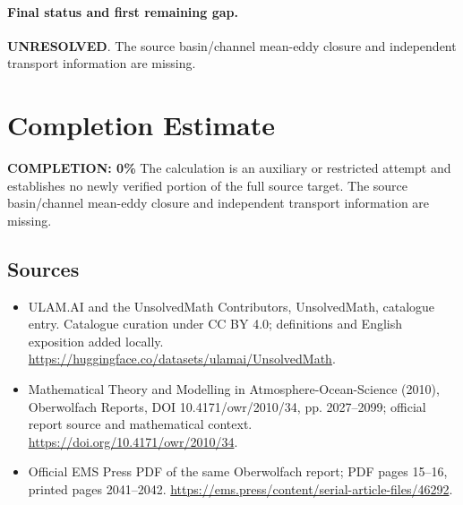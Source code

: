 \documentclass[11pt]{article}
\begin{document}
\paragraph{Final status and first remaining gap.}
\textbf{UNRESOLVED}. The source basin/channel mean-eddy closure and independent transport information are missing.

\section{Completion Estimate}
\noindent\textbf{COMPLETION: 0\%}
The calculation is an auxiliary or restricted attempt and establishes no newly verified portion of the full source target. The source basin/channel mean-eddy closure and independent transport information are missing.

\subsection{Sources}
\begin{itemize}
\item[\hypertarget{source:statement:1}{S1}] ULAM.AI and the UnsolvedMath Contributors, UnsolvedMath, catalogue entry. Catalogue curation under CC BY 4.0; definitions and English exposition added locally.
\url{https://huggingface.co/datasets/ulamai/UnsolvedMath}.
\item[\hypertarget{source:statement:2}{S2}] Mathematical Theory and Modelling in Atmosphere-Ocean-Science (2010), Oberwolfach Reports, DOI 10.4171/owr/2010/34, pp. 2027--2099; official report source and mathematical context.
\url{https://doi.org/10.4171/owr/2010/34}.
\item[\hypertarget{source:statement:3}{S3}] Official EMS Press PDF of the same Oberwolfach report; PDF pages 15--16, printed pages 2041--2042.
\url{https://ems.press/content/serial-article-files/46292}.
\end{itemize}
\label{end:statement}
\end{document}
